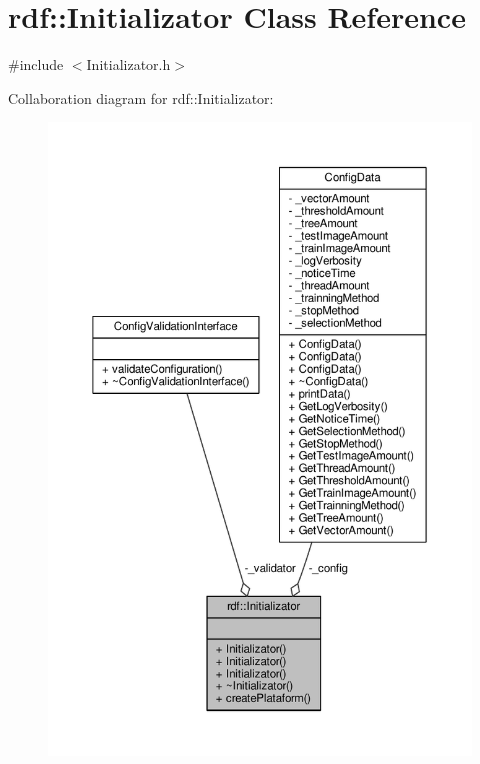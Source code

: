 \hypertarget{classrdf_1_1Initializator}{}\section{rdf\+:\+:Initializator Class Reference}
\label{classrdf_1_1Initializator}


{\ttfamily \#include $<$Initializator.\+h$>$}



Collaboration diagram for rdf\+:\+:Initializator\+:
\nopagebreak
\begin{figure}[H]
\begin{center}
\leavevmode
\includegraphics[width=350pt]{classrdf_1_1Initializator__coll__graph}
\end{center}
\end{figure}
